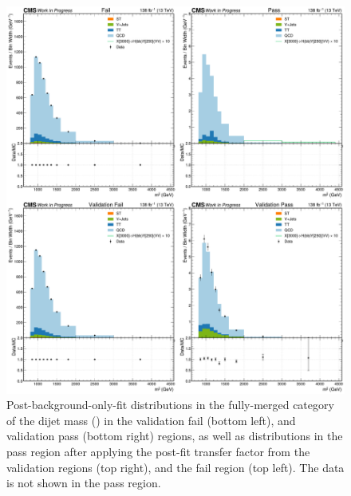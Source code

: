 \begin{figure}[hbt!]
\centering
\includegraphics[width=\textwidth]{figures/05-HH/results_res/postfit_DijetMass.pdf}
\caption[Post-background-only-fit distributions in the fully-merged category of the dijet mass (\mjj).]{Post-background-only-fit distributions in the fully-merged category of the dijet mass (\mjj) in the validation fail (bottom left), and validation pass (bottom right) regions, as well as distributions in the pass region after applying the post-fit transfer factor from the validation regions (top right), and the fail region (top left).
The data is not shown in the pass region. 
\label{fig:05_results_xhy_postfit_fm_mjj}
}
\end{figure}

